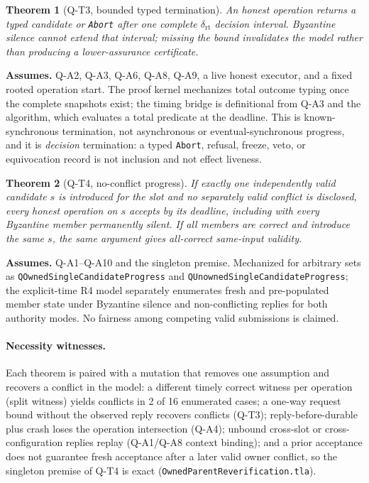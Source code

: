 \documentclass[11pt]{article}
\newtheorem{theorem}{Theorem}
\newcommand{\code}[1]{\texttt{#1}}
\begin{document}
\begin{theorem}[Q-T3, bounded typed termination]
\label{thm:quv-t3}
An honest operation returns a typed candidate or \code{Abort} after one
complete \(\delta_{\mathrm{rt}}\) decision interval. Byzantine silence cannot
extend that interval; missing the bound invalidates the model rather than
producing a lower-assurance certificate.
\end{theorem}
\noindent\textbf{Assumes.} Q-A2, Q-A3, Q-A6, Q-A8, Q-A9, a live honest
executor, and a fixed rooted operation start. The proof kernel mechanizes
total outcome typing once the complete snapshots exist; the timing bridge is
definitional from Q-A3 and the algorithm, which evaluates a total predicate
at the deadline. This is known-synchronous termination, not asynchronous or
eventual-synchronous progress, and it is \emph{decision} termination: a
typed \code{Abort}, refusal, freeze, veto, or equivocation record is not
inclusion and not effect liveness.

\begin{theorem}[Q-T4, no-conflict progress]
\label{thm:quv-t4}
If exactly one independently valid candidate \(s\) is introduced for the
slot and no separately valid conflict is disclosed, every honest operation on
\(s\) accepts by its deadline, including with every Byzantine member
permanently silent. If all members are correct and introduce the same \(s\),
the same argument gives all-correct same-input validity.
\end{theorem}
\noindent\textbf{Assumes.} Q-A1--Q-A10 and the singleton premise. Mechanized
for arbitrary sets as \code{QOwnedSingleCandidateProgress} and
\code{QUnownedSingleCandidateProgress}; the explicit-time R4 model separately
enumerates fresh and pre-populated member state under Byzantine silence and
non-conflicting replies for both authority modes. No fairness among competing
valid submissions is claimed.

\paragraph{Necessity witnesses.} Each theorem is paired with a mutation that
removes one assumption and recovers a conflict in the model: a different
timely correct witness per operation (split witness) yields conflicts in
2 of 16 enumerated cases; a one-way request bound without the observed reply
recovers conflicts (Q-T3); reply-before-durable plus crash loses the
operation intersection (Q-A4); unbound cross-slot or cross-configuration
replies replay (Q-A1/Q-A8 context binding); and a prior acceptance does not
guarantee fresh acceptance after a later valid owner conflict, so the
singleton premise of Q-T4 is exact (\code{OwnedParentReverification.tla}).
\end{document}

